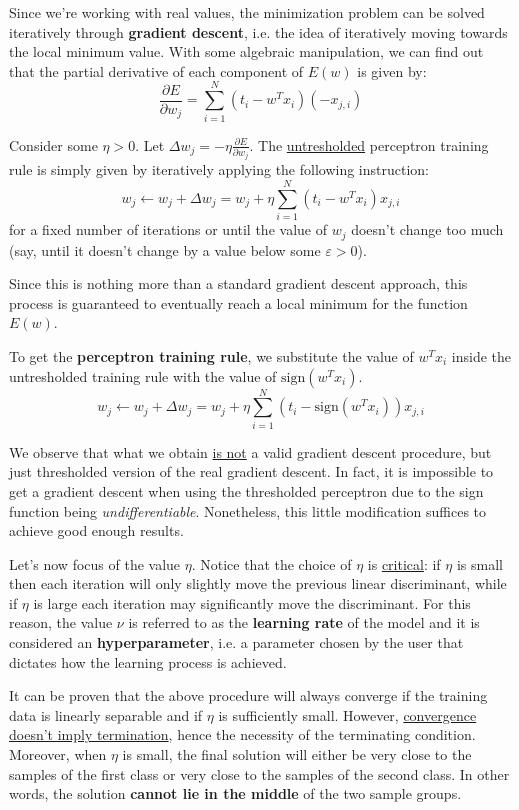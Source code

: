 \documentclass[a4paper, 12pt]{report}
\begin{document}
    Since we're working with real values, the minimization problem can be solved iteratively through \textbf{gradient descent}, i.e. the idea of iteratively moving towards the local minimum value. With some algebraic manipulation, we can find out that the partial derivative of each component of $E(w)$ is given by:
    \[\frac{\partial E}{\partial w_j} = \sum_{i = 1}^N (t_i - w^Tx_i)(-x_{j,i})\] 

    Consider some $\eta > 0$. Let $\Delta w_j = -\eta \frac{\partial E}{\partial w_j}$. The \underline{untresholded} perceptron training rule is simply given by iteratively applying the following instruction:
    \[w_j \gets w_j + \Delta w_j = w_j + \eta \sum_{i = 1}^N (t_i - w^Tx_i)x_{j,i}\]
    for a fixed number of iterations or until the value of $w_j$ doesn't change too much (say, until it doesn't change by a value below some $\varepsilon > 0$).

    Since this is nothing more than a standard gradient descent approach, this process is guaranteed to eventually reach a local minimum for the function $E(w)$.

    To get the \textbf{perceptron training rule}, we substitute the value of $w^Tx_i$ inside the untresholded training rule with the value of $\mathrm{sign}(w^Tx_i)$. 
    \[w_j \gets w_j + \Delta w_j = w_j + \eta \sum_{i = 1}^N (t_i - \mathrm{sign}(w^Tx_i))x_{j,i}\]

    We observe that what we obtain \underline{is not} a valid gradient descent procedure, but just thresholded version of the real gradient descent. In fact, it is impossible to get a gradient descent when using the thresholded perceptron due to the sign function being \textit{undifferentiable}. Nonetheless, this little modification suffices to achieve good enough results.
    
    Let's now focus of the value $\eta$. Notice that the choice of $\eta$ is \underline{critical}: if $\eta$ is small then each iteration will only slightly move the previous linear discriminant, while if $\eta$ is large each iteration may significantly move the discriminant. For this reason, the value $\nu$ is referred to as the \textbf{learning rate} of the model and it is considered an \textbf{hyperparameter}, i.e. a parameter chosen by the user that dictates how the learning process is achieved.

    It can be proven that the above procedure will always converge if the training data is linearly separable and if $\eta$ is sufficiently small. However, \underline{convergence doesn't imply termination}, hence the necessity of the terminating condition. Moreover, when $\eta$ is small, the final solution will either be very close to the samples of the first class or very close to the samples of the second class. In other words, the solution \textbf{cannot lie in the middle} of the two sample groups.  
\end{document}
